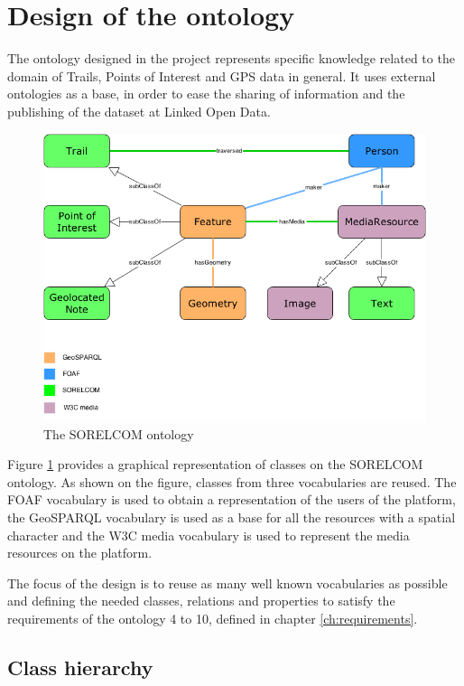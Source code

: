 \section{Design of the ontology}\label{sec:ontdesign}

The ontology designed in the project represents specific knowledge related to the domain of Trails, Points of Interest and GPS data in general. It uses external ontologies as a base, in order to ease the sharing of information and the publishing of the dataset at Linked Open Data.

\begin{figure}[ht]
  \centering
  \includegraphics[width=.8\textwidth]{fig/sorelcom-ontology}
  \caption{The SORELCOM ontology}
  \label{fig:sorelcom-ontology}
\end{figure} 

Figure \ref{fig:sorelcom-ontology} provides a graphical representation of classes on the SORELCOM ontology. As shown on the figure, classes from three vocabularies are reused. The FOAF vocabulary is used to obtain a representation of the users of the platform, the GeoSPARQL vocabulary is used as a base for all the resources with a spatial character and the W3C media vocabulary is used to represent the media resources on the platform.

The focus of the design is to reuse as many well known vocabularies as possible and defining the needed classes, relations and properties to satisfy the requirements of the ontology 4 to 10, defined in chapter \ref{ch:requirements}.

\subsection{Class hierarchy}

